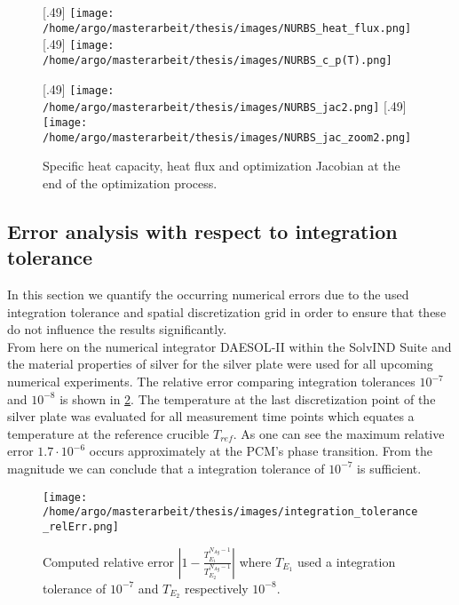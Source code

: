 \documentclass{scrartcl}[12pt, halfparskip]
\numberwithin{equation}{section}
\numberwithin{figure}{section}
\numberwithin{table}{section}
\begin{document}
\begin{figure}[H]
	[.49\linewidth]
	{\texttt{[image: /home/argo/masterarbeit/thesis/images/NURBS\_heat\_flux.png]}}
	[.49\linewidth]
	{\texttt{[image: /home/argo/masterarbeit/thesis/images/NURBS\_c\_p(T).png]}}

	[.49\linewidth]
	{\texttt{[image: /home/argo/masterarbeit/thesis/images/NURBS\_jac2.png]}}
	\hspace{0.5cm}
	[.49\linewidth]
	{\texttt{[image: /home/argo/masterarbeit/thesis/images/NURBS\_jac\_zoom2.png]}}
	\caption{Specific heat capacity, heat flux and optimization Jacobian at the end of the optimization process.}
	\label{fig:NURBS_results}
\end{figure}




\subsection{Error analysis with respect to integration tolerance}
In this section we quantify the occurring numerical errors due to the used integration tolerance and spatial discretization grid in order to ensure that these do not influence the results significantly. \\
From here on the numerical integrator DAESOL-II within the SolvIND Suite and the material properties of silver for the silver plate were used for all upcoming numerical experiments. The relative error comparing integration tolerances $10^{-7}$ and $10^{-8}$  is shown in \cref{fig:integration_tolerance_error}.
The temperature at the last discretization point of the silver plate was evaluated for all measurement time points which equates a temperature at the reference crucible $T_{ref}$. 
As one can see the maximum relative error $1.7 \cdot 10^{-6}$ occurs approximately at the PCM's phase transition. 
From the magnitude we can conclude that a integration tolerance of $10^{-7}$ is sufficient. \\


\begin{figure}[H]
	\centering
	\texttt{[image: /home/argo/masterarbeit/thesis/images/integration\_tolerance\_relErr.png]}
	\caption{Computed relative error $|1 - \frac{T^{N_{Ag}-1}_{E_1}}{T^{N_{Ag}-1}_{E_2}}|$ where $T_{E_1}$ used a integration tolerance of $10^{-7}$ and $T_{E_2}$ respectively $10^{-8}$.}
	\label{fig:integration_tolerance_error}
\end{figure}
\end{document}
